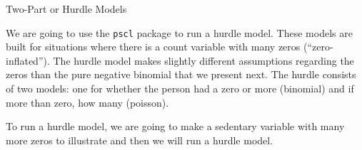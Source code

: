 \begin{frame}[fragile]{Two-Part or Hurdle Models}

We are going to use the \texttt{pscl} package to run a hurdle model.
These models are built for situations where there is a count variable
with many zeros (``zero-inflated''). The hurdle model makes slightly
different assumptions regarding the zeros than the pure negative
binomial that we present next. The hurdle consists of two models: one
for whether the person had a zero or more (binomial) and if more than
zero, how many (poisson).

To run a hurdle model, we are going to make a sedentary variable with
many more zeros to illustrate and then we will run a hurdle model.

\small

\begin{Shaded}
\end{Shaded}


\end{frame}
